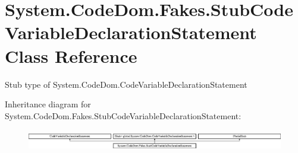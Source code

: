 \hypertarget{class_system_1_1_code_dom_1_1_fakes_1_1_stub_code_variable_declaration_statement}{\section{System.\-Code\-Dom.\-Fakes.\-Stub\-Code\-Variable\-Declaration\-Statement Class Reference}
\label{class_system_1_1_code_dom_1_1_fakes_1_1_stub_code_variable_declaration_statement}
}


Stub type of System.\-Code\-Dom.\-Code\-Variable\-Declaration\-Statement 


Inheritance diagram for System.\-Code\-Dom.\-Fakes.\-Stub\-Code\-Variable\-Declaration\-Statement\-:\begin{figure}[H]
\begin{center}
\leavevmode
\includegraphics[height=0.910569cm]{class_system_1_1_code_dom_1_1_fakes_1_1_stub_code_variable_declaration_statement}
\end{center}
\end{figure}
